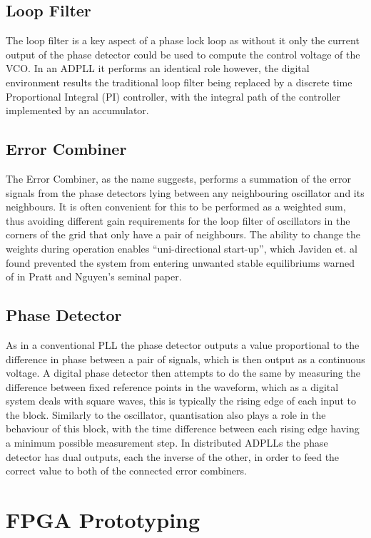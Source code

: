 \documentclass[conference]{IEEEtran}
\begin{document}
{\subsection{Loop Filter}
The loop filter is a key aspect of a phase lock loop as without it only the current output of the phase detector could be used to compute the control voltage of the VCO.
In an ADPLL it performs an identical role however, the digital environment results the traditional loop filter being replaced by a discrete time Proportional Integral (PI) controller, with the integral path of the controller implemented by an accumulator.
\subsection{Error Combiner}
The Error Combiner, as the name suggests, performs a summation of the error signals from the phase detectors lying between any neighbouring oscillator and its neighbours. It is often convenient for this to be performed as a weighted sum, thus avoiding different gain requirements for the loop filter of oscillators in the corners of the grid that only have a pair of neighbours. The ability to change the weights during operation enables ``uni-directional start-up'', which Javiden et. al \cite{javidan2011all} found prevented the system from entering unwanted stable equilibriums warned of in Pratt and Nguyen's seminal paper.
\subsection{Phase Detector}
As in a conventional PLL the phase detector outputs a value proportional to the difference in phase between a pair of signals, which is then output as a continuous voltage.
A digital phase detector then attempts to do the same by measuring the difference between fixed reference points in the waveform, which as a digital system deals with square waves, this is typically the rising edge of each input to the block.
Similarly to the oscillator, quantisation also plays a role in the behaviour of this block, with the time difference between each rising edge having a minimum possible measurement step.
In distributed ADPLLs the phase detector has dual outputs, each the inverse of the other, in order to feed the correct value to both of the connected error combiners. 

\section{FPGA Prototyping}
}
\end{document}
